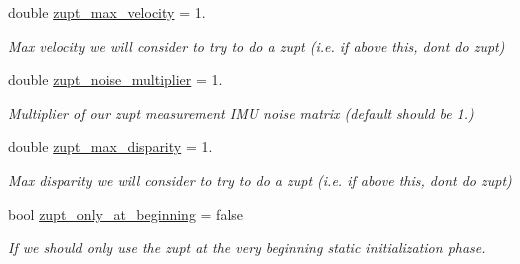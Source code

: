 \begin{DoxyCompactItemize}
\mbox{\label{structov__msckf_1_1VioManagerOptions_ad1a08e427b280edf0bb7a64ea71d1c80}} 
double \hyperlink{structov__msckf_1_1VioManagerOptions_ad1a08e427b280edf0bb7a64ea71d1c80}{zupt\+\_\+max\+\_\+velocity} = 1.
\begin{DoxyCompactList}\small\item\em Max velocity we will consider to try to do a zupt (i.\+e. if above this, don\textquotesingle{}t do zupt) \end{DoxyCompactList}\item 
\mbox{\label{structov__msckf_1_1VioManagerOptions_a9c9396ee0ec6228d99d458e8a02f47cd}} 
double \hyperlink{structov__msckf_1_1VioManagerOptions_a9c9396ee0ec6228d99d458e8a02f47cd}{zupt\+\_\+noise\+\_\+multiplier} = 1.
\begin{DoxyCompactList}\small\item\em Multiplier of our zupt measurement I\+MU noise matrix (default should be 1.) \end{DoxyCompactList}\item 
\mbox{\label{structov__msckf_1_1VioManagerOptions_a0d6b97164305763b5f1c5e302fbeb02a}} 
double \hyperlink{structov__msckf_1_1VioManagerOptions_a0d6b97164305763b5f1c5e302fbeb02a}{zupt\+\_\+max\+\_\+disparity} = 1.
\begin{DoxyCompactList}\small\item\em Max disparity we will consider to try to do a zupt (i.\+e. if above this, don\textquotesingle{}t do zupt) \end{DoxyCompactList}\item 
\mbox{\label{structov__msckf_1_1VioManagerOptions_a0b65d82ff8ef21e22774f070d9f42938}} 
bool \hyperlink{structov__msckf_1_1VioManagerOptions_a0b65d82ff8ef21e22774f070d9f42938}{zupt\+\_\+only\+\_\+at\+\_\+beginning} = false
\begin{DoxyCompactList}\small\item\em If we should only use the zupt at the very beginning static initialization phase. \end{DoxyCompactList}\item 
\mbox{\label{structov__msckf_1_1VioManagerOptions_af1c76781e016ae09e49bd4d8e42006e6}} 

\end{DoxyCompactItemize}
